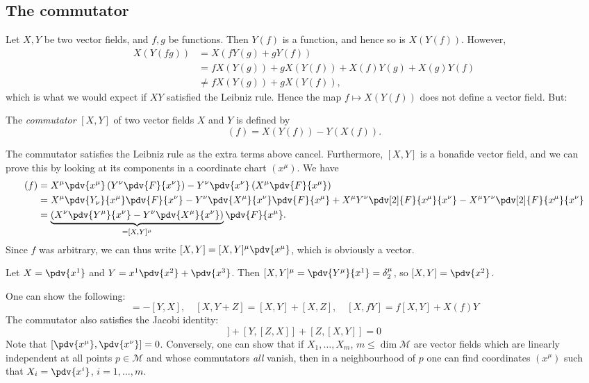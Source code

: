 \documentclass{jknotes}
\begin{document}
\subsection{The commutator}
Let \(X,Y\) be two vector fields, and \(f,g\) be functions. Then \(Y(f)\) is a function, and hence so is \(X(Y(f))\). However,
\begin{align}
    X(Y(fg)) &= X(fY(g) + gY(f)) \\
             &= fX(Y(g)) + gX(Y(f)) + X(f)Y(g)+X(g)Y(f) \\
             &\ne fX(Y(g)) + gX(Y(f)),
\end{align}
which is what we would expect if \(XY\) satisfied the Leibniz rule. Hence the map \(f\mapsto X(Y(f))\) does not define a vector field. But:
\begin{defn}
    The \emph{commutator} \([X,Y]\) of two vector fields \(X\) and \(Y\) is defined by
    \begin{equation}
        [X,Y](f) = X(Y(f)) - Y(X(f)).
    \end{equation}
\end{defn}
The commutator satisfies the Leibniz rule as the extra terms above cancel. Furthermore, \([X,Y]\) is a bonafide vector field, and we can prove this by looking at its components in a coordinate chart \((x^\mu)\). We have
\begin{align}
    [X,Y](f) &= X^\mu\pdv{x^\mu}\left(Y^\nu\pdv{F}{x^\nu}\right) - Y^\nu\pdv{x^\nu}\left(X^\mu\pdv{F}{x^\mu}\right) \\
             &= X^\mu\pdv{Y_\nu}{x^\mu}\pdv{F}{x^\nu} - Y^\nu\pdv{X^\mu}{x^\nu}\pdv{F}{x^\mu}
                + X^\mu Y^\nu\pdv[2]{F}{x^\mu}{x^\nu} - X^\mu Y^\nu\pdv[2]{F}{x^\mu}{x^\nu} \\
             &= \underbrace{\left(X^\nu\pdv{Y^\mu}{x^\nu}-Y^\nu\pdv{X^\mu}{x^\nu}\right)}_{=[X,Y]^\mu}\pdv{F}{x^\mu}.
\end{align}
Since \(f\) was arbitrary, we can thus write \([X,Y] = [X,Y]^\mu\pdv{x^\mu}\), which is obviously a vector.

\begin{eg}
    Let \(X=\pdv{x^1}\) and \(Y = x^1\pdv{x^2} + \pdv{x^3}\). Then \([X,Y]^\mu = \pdv{Y^\mu}{x^1} = \delta^\mu_2\), so \([X,Y] = \pdv{x^2}\).
\end{eg}
One can show the following:
\begin{equation}
    [X,Y]=-[Y,X],\quad
    [X,Y+Z] = [X,Y] + [X,Z],\quad
    [X,fY] = f[X,Y] + X(f)Y
\end{equation}
The commutator also satisfies the Jacobi identity:
\begin{equation}
    [X,[Y,Z]] + [Y,[Z,X]] + [Z,[X,Y]] = 0
\end{equation}
Note that \(\left[\pdv{x^\mu},\pdv{x^\nu}\right] = 0\). Conversely, one can show that if \(X_1,\dots,X_m\), \(m\le\dim\mathcal{M}\) are vector fields which are linearly independent at all points \(p\in\mathcal{M}\) and whose commutators \emph{all} vanish, then in a neighbourhood of \(p\) one can find coordinates \((x^\mu)\) such that \(X_i = \pdv{x^i}\), \(i=1,\dots,m\).
\end{document}
